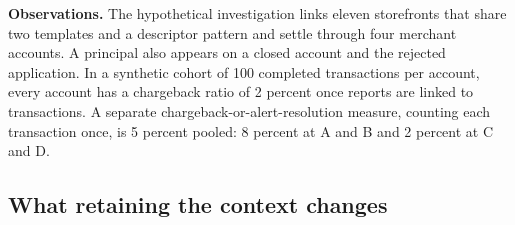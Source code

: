 \documentclass[acmlarge,nonacm]{acmart}
\begin{document}
\textbf{Observations.} The hypothetical investigation links eleven
storefronts that share two templates and a descriptor pattern and settle
through four merchant accounts. A principal also appears on a closed
account and the rejected application. In a synthetic cohort of 100
completed transactions per account, every account has a chargeback ratio
of 2 percent once reports are linked to transactions. A separate
chargeback-or-alert-resolution measure, counting each transaction once,
is 5 percent pooled: 8 percent at A and B and 2 percent at C and D.

\hypertarget{what-retaining-the-context-changes}{%
\subsection{What retaining the context
changes}\label{what-retaining-the-context-changes}}

\begingroup\footnotesize
\end{document}
